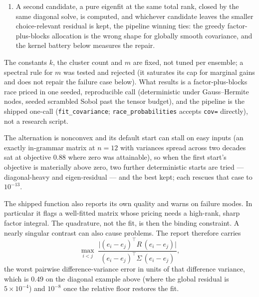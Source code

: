 \documentclass[11pt]{article}
\begin{document}
\begin{enumerate}
covariance residual sat one hundred times below the warning threshold. The Gram is exactly
$(1-\tfrac2n)I+\tfrac1{n^2}\mathbf{1}\mathbf{1}^{\top}$, so the
constrained solve is closed form in $O(n)$: substituting $d=\ell+x$
componentwise with $x\ge0$, writing $\ell$ for the vector of
per-runner floors, leaves the same Gram with a shifted right-hand side,
and the KKT conditions make the active set a threshold set, solved by
water-filling. It is the constrained minimizer, not an
unconstrained solve with a floor applied afterwards, which the Gram's
off-diagonal coupling would leave suboptimal. At $n=2$ the Gram is rank
one, only $d_1+d_2$ is identified, and the symmetric representative is
returned.
\item A second candidate, a pure eigenfit at the same total rank, closed by the same
diagonal solve, is computed, and whichever candidate leaves the
smaller choice-relevant residual is kept, the pipeline winning ties:
the greedy factor-plus-blocks allocation is the wrong shape for
globally smooth covariance, and the kernel battery below measures the repair.
\end{enumerate}

The constants $k$, the cluster count and $m$ are
fixed, not tuned per ensemble; a spectral rule for $m$ was tested and
rejected (it saturates its cap for marginal gains and does not repair the
failure case below). What results is a factor-plus-blocks race priced in
one seeded, reproducible call (deterministic under Gauss--Hermite
nodes, seeded scrambled Sobol past the tensor budget), and the pipeline
is the shipped one-call
(\texttt{fit\_covariance}; \texttt{race\_probabilities} accepts
\texttt{cov=} directly), not a research script.

The alternation
is nonconvex and its default start can stall on easy inputs (an exactly
in-grammar matrix at $n=12$ with variances spread across two decades sat
at objective $0.88$ where zero was attainable), so when the first
start's objective is materially above zero, two further deterministic
starts are tried --- diagonal-heavy and eigen-residual --- and the best
kept; each rescues that case to $10^{-13}$.

The shipped function also
reports its own quality and warns on failure modes. In particular it
flags a well-fitted matrix whose pricing needs a high-rank, sharp factor
integral. The quadrature, not the fit, is then the binding constraint. A nearly
singular
contrast can also cause problems. The report therefore carries
\[
\max_{i<j}\;
\frac{\bigl|(e_i-e_j)^{\top}R\,(e_i-e_j)\bigr|}
     {(e_i-e_j)^{\top}\Sigma\,(e_i-e_j)} ,
\]
the worst pairwise difference-variance error in units of that
difference variance, which is $0.49$ on the diagonal example above
(where the global residual is $5\times10^{-4}$) and $10^{-8}$ once the
relative floor restores the fit.
\end{document}
